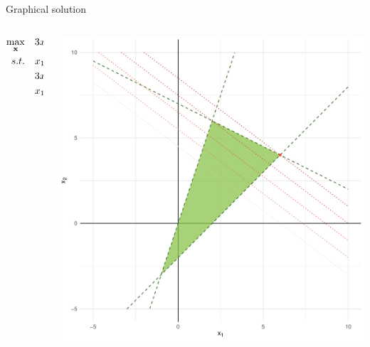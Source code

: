 \documentclass[12pt,aspectratio=169]{beamer}
\renewcommand{\vec}[1]{\ensuremath{\mathbf{#1}}}
\begin{document}
\begin{frame}{Graphical solution}
    \begin{columns}
        \begin{column}{0.5\textwidth}
            \begin{align*}
                \max_{\vec{x}}    \quad& 3 x_{1} + 4 x_{2} \\
                \mathnormal{s.t.} \quad& x_{1} + 2 x_{2} \leq 14 \\
                                       & 3 x_{1} - x_{2} \geq 0 \\
                                       & x_{1} - x_{2} \leq 2
            \end{align*}
        \end{column}
        \begin{column}{0.5\textwidth}
            \centering%
            \includegraphics[width=\textwidth]{figures/lp}
        \end{column}
   \end{columns}
\end{frame}
\end{document}
